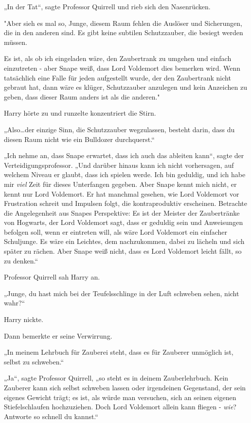 {„In der Tat“, sagte Professor Quirrell und rieb sich den Nasenrücken.

"Aber sieh es mal so, Junge, diesem Raum fehlen die Auslöser und Sicherungen, die in den anderen sind. Es gibt keine subtilen Schutzzauber, die besiegt werden müssen.

Es ist, als ob ich eingeladen wäre, den Zaubertrank zu umgehen und einfach einzutreten - aber Snape weiß, dass Lord Voldemort dies bemerken wird. Wenn tatsächlich eine Falle für jeden aufgestellt wurde, der den Zaubertrank nicht gebraut hat, dann wäre es klüger, Schutzzauber anzulegen und kein Anzeichen zu geben, dass dieser Raum anders ist als die anderen."

Harry hörte zu und runzelte konzentriert die Stirn.

„Also…der einzige Sinn, die Schutzzauber wegzulassen, besteht darin, dass du diesen Raum nicht wie ein Bulldozer durchquerst.“

„Ich nehme an, dass Snape erwartet, dass ich auch das ableiten kann“, sagte der Verteidigungsprofessor. „Und darüber hinaus kann ich nicht vorhersagen, auf welchem Niveau er glaubt, dass ich spielen werde. Ich bin geduldig, und ich habe mir \emph{viel} Zeit für dieses Unterfangen gegeben. Aber Snape kennt mich nicht, er kennt nur Lord Voldemort. Er hat manchmal gesehen, wie Lord Voldemort vor Frustration schreit und Impulsen folgt, die kontraproduktiv erscheinen. Betrachte die Angelegenheit aus Snapes Perspektive: Es ist der Meister der Zaubertränke von Hogwarts, der Lord Voldemort sagt, dass er geduldig sein und Anweisungen befolgen soll, wenn er eintreten will, als wäre Lord Voldemort ein einfacher Schuljunge. Es wäre ein Leichtes, dem nachzukommen, dabei zu lächeln und sich später zu rächen. Aber Snape weiß nicht, dass es Lord Voldemort leicht fällt, so zu denken.“

Professor Quirrell sah Harry an.

„Junge, du hast mich bei der Teufelsschlinge in der Luft schweben sehen, nicht wahr?“

Harry nickte.

Dann bemerkte er seine Verwirrung.

„In meinem Lehrbuch für Zauberei steht, dass es für Zauberer unmöglich ist, selbst zu schweben.“

„Ja“, sagte Professor Quirrell, „so steht es in deinem Zauberlehrbuch. Kein Zauberer kann sich selbst schweben lassen oder irgendeinen Gegenstand, der sein eigenes Gewicht trägt; es ist, als würde man versuchen, sich an seinen eigenen Stiefelschlaufen hochzuziehen. Doch Lord Voldemort allein kann fliegen - \emph{wie}? Antworte so schnell du kannst.“

}
